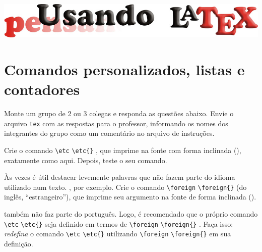 \documentclass[a4paper,10pt,twocolumn,landscape]{article}
\begin{document}
	
	\newcommand{\contador}[1]{\textit{#1}}
	\newcommand{\pacote}[1]{\textcolor{orange}{#1}}
	\newcommand{\etc}{\textsl{et cetera}} %
	
	\newcommand{\cs}[1]{\texttt{\textbackslash #1}} %
	\renewcommand{\etc}{\foreign{et cetera}}
	\renewcommand{\cs}[2][\null]{%
		\ifthenelse{\equal{#1}{\null}}%
		{\texttt{\textbackslash #2}}%
		{\texttt{\textbackslash #2\{#1\}}}%
	}

	\begin{center}\includegraphics[width=0.8\columnwidth]{../figuras/LogotipoCursoLaTeX_v2}\end{center}

	\section*{Comandos personalizados, listas e contadores}

	Monte um grupo de 2 ou 3 colegas e responda as questões abaixo. Envie o 
	arquivo \texttt{tex} com as respostas para o professor, informando os nomes
	dos integrantes do grupo como um comentário no arquivo de instruções.

	\bigskip

	\begin{exercicio}
	Crie o comando \cs{etc}, que imprime  na fonte com forma
	inclinada (), exatamente como aqui. Depois, teste o seu
	comando.
	\end{exercicio}
	
	\begin{exercicio}
	Às vezes é útil destacar levemente palavras que não fazem parte do idioma
	utilizado num texto. , por exemplo. Crie o comando
	\cs{foreign} (do inglês, ``estrangeiro''), que imprime seu argumento na
	fonte de forma inclinada ().
	\end{exercicio}
		
	\begin{exercicio}
	 também não faz parte do português. Logo, é recomendado
	que o próprio comando \cs{etc} seja definido em termos de \cs{foreign}. Faça
	isso: \emph{redefina} o comando \cs{etc} utilizando \cs{foreign} em sua
	definição.
	\end{exercicio}
	
\end{document}
